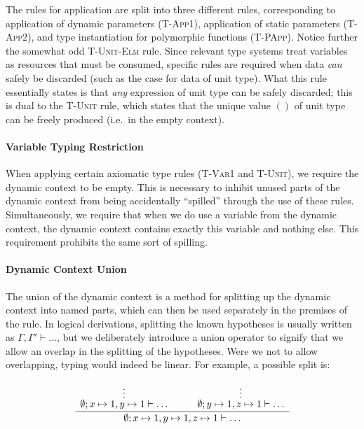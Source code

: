 The rules for application are split into three different rules, corresponding
to application of dynamic parameters (\textsc{T-App1}), application of static
parameters (\textsc{T-App2}), and type instantiation for polymorphic functions
(\textsc{T-PApp}). Notice further the somewhat odd \textsc{T-Unit-Elm} rule.
Since relevant type systems treat variables as resources that must be consumed,
specific rules are required when data \emph{can} safely be discarded (such as
the case for data of unit type). What this rule essentially states is that
\emph{any} expression of unit type can be safely discarded; this is dual to the
\textsc{T-Unit} rule, which states that the unique value $()$ of unit type can
be freely produced (i.e.~in the empty context).

\paragraph{Variable Typing Restriction}

When applying certain axiomatic type rules (\textsc{T-Var1} and
\textsc{T-Unit}), we require the dynamic context to be empty. This is necessary
to inhibit unused parts of the dynamic context from being accidentally
``spilled'' through the use of these rules. Simultaneously, we require that
when we do use a variable from the dynamic context, the dynamic context
contains exactly this variable and nothing else. This requirement prohibits
the same sort of spilling.

\paragraph{Dynamic Context Union}

The union of the dynamic context is a method for splitting up the dynamic
context into named parts, which can then be used separately in the premises of
the rule. In logical derivations, splitting the known hypotheses is usually
written as $\Gamma, \Gamma' \vdash \dots$, but we deliberately introduce a
union operator to signify that we allow an overlap in the splitting of the
hypotheses. Were we not to allow overlapping, typing would indeed be linear.
For example, a possible split is:

$$
  \dfrac
    {\begin{array}{ccc}
        \overset{\vdots}{\emptyset; x \mapsto 1, y \mapsto 1 \vdash \dots} &
        \quad &
        \overset{\vdots}{\emptyset; y \mapsto 1, z \mapsto 1 \vdash \dots}
     \end{array}}
    {\emptyset; x \mapsto 1, y \mapsto 1, z \mapsto 1 \vdash \dots}
$$

